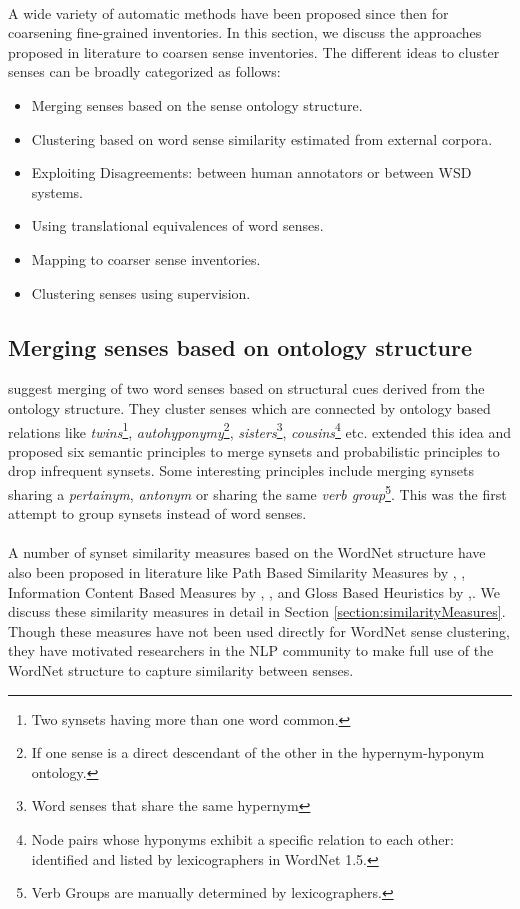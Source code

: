 \paragraph{}
A wide variety of automatic methods have been proposed since then for coarsening fine-grained inventories. In this section, we discuss the approaches proposed in literature to coarsen sense inventories. The different ideas to cluster senses can be broadly categorized as follows: 
\begin{itemize}
\item Merging senses based on the sense ontology structure.
\item Clustering based on word sense similarity estimated from external corpora.
\item Exploiting Disagreements: between human annotators or between WSD systems.
\item Using translational equivalences of word senses.
\item Mapping to coarser sense inventories.
\item Clustering senses using supervision.
\end{itemize}

\subsection{Merging senses based on ontology structure}
\citep{peters1998automatic} suggest merging of two word senses based on structural cues derived from the ontology structure. They cluster senses which are connected by ontology based relations like  \textit{twins}\footnote{Two synsets having more than one word common.}, \textit{autohyponymy}\footnote{If one sense is a direct descendant of the other in the hypernym-hyponym ontology.}, 
\textit{sisters}\footnote{Word senses that share the same hypernym}, 
\textit{cousins}\footnote{Node pairs whose hyponyms exhibit a specific relation to each other: identified and listed by lexicographers in WordNet 1.5.} etc.
\citep{Mihalcea01ez.wordnet:principles} extended this idea and proposed six semantic principles to merge synsets and probabilistic principles to drop infrequent synsets.
Some interesting principles include merging synsets sharing a \textit{pertainym}, \textit{antonym} or sharing the same \textit{verb group}\footnote{Verb Groups are manually determined by lexicographers.}.
This was the first attempt to group synsets instead of word senses.

\paragraph{}
A number of synset similarity measures based on the WordNet structure have also been proposed in literature like 
Path Based Similarity Measures by \citep{WuPalmer:1994}, \citep{LCH:1998}, Information Content Based Measures by \citep{Resnik:1995}, \citep{JCN:1997}, \citep{Lin:1998} and Gloss Based Heuristics by \citep{Lesk:1986},\citep{Banerjee:2002}. We discuss these similarity measures in detail in Section \ref{section:similarityMeasures}.
Though these measures have not been used directly for WordNet sense clustering, they have motivated researchers in the NLP community to make full use of the WordNet structure to capture similarity between senses.


